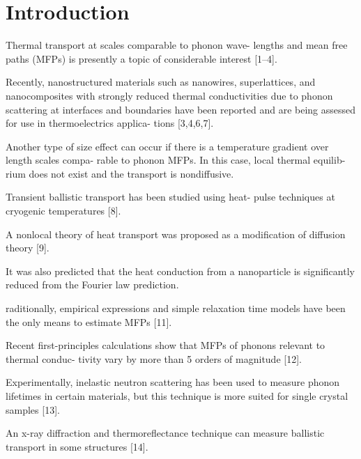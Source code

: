 \documentclass[aps,prb,twocolumn,superscriptaddress,footinbib,amsmath,amssymb,floatfix]{revtex4}
\begin{document}
\section{\label{S:Introduction}Introduction}

Thermal transport at scales comparable to phonon wave-
lengths and mean free paths (MFPs) is presently a topic of
considerable interest [1–4].\cite{cahill_nanoscale_2003,
yu_reduction_2010,hochbaum_enhanced_2008,pernot_precise_2010}

Recently, nanostructured materials
such as nanowires, superlattices, and nanocomposites with
strongly reduced thermal conductivities due to phonon
scattering at interfaces and boundaries have been reported
and are being assessed for use in thermoelectrics applica-
tions [3,4,6,7].\cite{hochbaum_enhanced_2008,pernot_precise_2010,
boukai_silicon_2008,poudel_high-thermoelectric_2008}

Another type of size effect can occur if
there is a temperature gradient over length scales compa-
rable to phonon MFPs. In this case, local thermal equilib-
rium does not exist and the transport is nondiffusive.

Transient ballistic transport has been studied using heat-
pulse techniques at cryogenic temperatures [8].
\cite{von Gutfeld_heat_1964} 

A nonlocal
theory of heat transport was proposed as a modification of
diffusion theory [9].\cite{mahan_nonlocal_1988} 

It was also predicted that the heat
conduction from a nanoparticle is significantly reduced
from the Fourier law prediction.\cite{chen_particularities_2000}

raditionally, empirical expressions and
simple relaxation time models have been the only means
to estimate MFPs [11].\cite{holland_analysis_1963} 

Recent first-principles calculations
show that MFPs of phonons relevant to thermal conduc-
tivity vary by more than 5 orders of magnitude [12].
\cite{ward_intrinsic_2010}

Experimentally, inelastic neutron scattering has been
used to measure phonon lifetimes in certain materials,
but this technique is more suited for single crystal samples
[13].\cite{christianson_phonon_2008} 

An x-ray diffraction and thermoreflectance technique
can measure ballistic transport in some structures [14].
\cite{highland_ballistic-phonon_2007}
\end{document}
